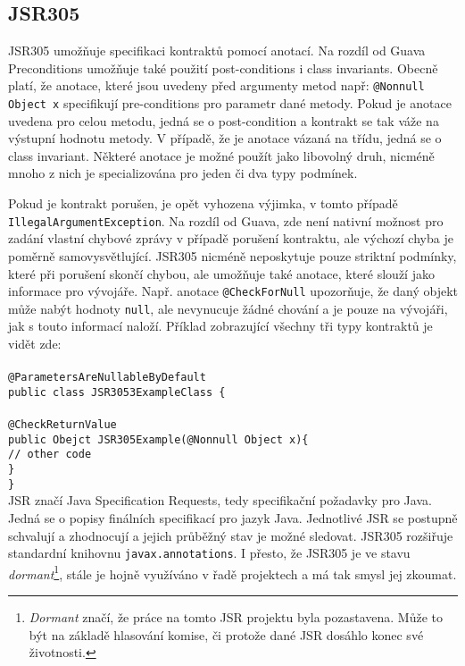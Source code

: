 		\subsection{JSR305}
			JSR305 umožňuje specifikaci kontraktů pomocí anotací. Na rozdíl od Guava Preconditions umožňuje také použití post-conditions i class invariants. Obecně platí, že anotace, které jsou uvedeny před argumenty metod např: \texttt{@Nonnull Object x} specifikují pre-conditions pro parametr dané metody. Pokud je anotace uvedena pro celou metodu, jedná se o post-condition a kontrakt se tak váže na výstupní hodnotu metody. V případě, že je anotace vázaná na třídu, jedná se o class invariant. Některé anotace je možné použít jako libovolný druh, nicméně mnoho z nich je specializována pro jeden či dva typy podmínek. 
			
			Pokud je kontrakt porušen, je opět vyhozena výjimka, v tomto případě \texttt{IllegalArgumentException}. Na rozdíl od Guava, zde není nativní možnost pro zadání vlastní chybové zprávy v případě porušení kontraktu, ale výchozí chyba je poměrně samovysvětlující. JSR305 nicméně neposkytuje pouze striktní podmínky, které při porušení skončí chybou, ale umožňuje také anotace, které slouží jako informace pro vývojáře. Např. anotace \texttt{@CheckForNull} upozorňuje, že daný objekt může nabýt hodnoty \texttt{null}, ale nevynucuje žádné chování a je pouze na vývojáři, jak s touto informací naloží. Příklad zobrazující všechny tři typy kontraktů je vidět zde:\\\\			
			\- \- \- \- \- \texttt{@ParametersAreNullableByDefault}\\
			\- \- \- \- \- \texttt{public class JSR3053ExampleClass \{}\\\\
   			\- \- \- \- \- \- \- \- \- \- \texttt{@CheckReturnValue}\\
    		\- \- \- \- \- \- \- \- \- \- \texttt{public Obejct JSR305Example(@Nonnull Object x)\{}\\
      		\- \- \- \- \- \- \- \- \- \- \- \- \- \- \- \texttt{// other code}\\
    		\- \- \- \- \- \- \- \- \- \- \texttt{\}}\\
			\- \- \- \- \- \texttt{\}}\\
			
			JSR značí Java Specification Requests, tedy specifikační požadavky pro Java. Jedná se o popisy finálních specifikací pro jazyk Java. Jednotlivé JSR se postupně schvalují a zhodnocují a jejich průběžný stav je možné sledovat. JSR305 rozšiřuje standardní knihovnu \texttt{javax.annotations}. I přesto, že JSR305 je ve stavu \emph{dormant}\footnote{\emph{Dormant} značí, že práce na tomto JSR projektu byla pozastavena. Může to být na základě hlasování komise, či protože dané JSR dosáhlo konec své životnosti.}, stále je hojně využíváno v řadě projektech a má tak smysl jej zkoumat.
			\cite{jsr305} 
	
